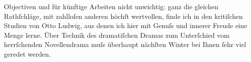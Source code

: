 \begin{ledgroupsized}[t]{13cm}
                  Objectiven und für künftige Arbeiten nicht unwichtig: ganz die gleichen
                  Rathſchläge, mit zahlloſen anderen höchſt wertvollen, finde ich in den kritiſchen
                  Studien von Otto Ludwig, aus denen ich hier
                  mit Genuſs und innerer Freude eine Menge lerne. Über Technik des dramatiſchen
                  Dramas zum Unterſchied vom herrſchenden Novellendrama muſs überhaupt nächſten
                  Winter bei Ihnen ſehr viel geredet werden.\pend
                     \endnumbering{}\end{ledgroupsized}  \newcommand{\dateiname}{L00111}\newcommand{\titel}{Hugo von Hofmannsthal an Arthur Schnitzler, 4. 8. [1892]}\newcommand{\editorInnen}{Martin Anton Müller und Gerd-Hermann Susen}
            \footnotesize
\begin{ledgroupsized}[t]{11.5cm}
\end{ledgroupsized}
         
      